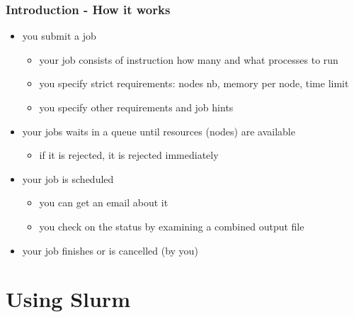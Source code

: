 \documentclass[10pt,mathserif, notes]{beamer}
\begin{document}
\begin{frame}[fragile]
\frametitle{Introduction - How it works}
\begin{itemize}
\item you submit a job
\begin{itemize}
\item your job consists of instruction how many and what processes to run
\item you specify strict requirements: nodes nb, memory per node, time limit
\item you specify other requirements and job hints
\end{itemize}
\item your jobs waits in a queue until resources (nodes) are available
\begin{itemize}
\item if it is rejected, it is rejected immediately
\end{itemize}
\item your job is scheduled
\begin{itemize}
\item you can get an email about it
\item you check on the status by examining a combined output file
\end{itemize}
\item your job finishes or is cancelled (by you)
\end{itemize}
\end{frame}

\section{Using Slurm}
\end{document}
